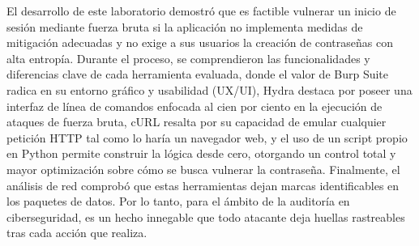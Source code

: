 \documentclass[letter,12pt]{article}
\begin{document}
El desarrollo de este laboratorio demostró que es factible vulnerar un inicio de sesión mediante fuerza bruta si la aplicación no implementa medidas de mitigación adecuadas y no exige a sus usuarios la creación de contraseñas con alta entropía. Durante el proceso, se comprendieron las funcionalidades y diferencias clave de cada herramienta evaluada, donde el valor de Burp Suite radica en su entorno gráfico y usabilidad (UX/UI), Hydra destaca por poseer una interfaz de línea de comandos enfocada al cien por ciento en la ejecución de ataques de fuerza bruta, cURL resalta por su capacidad de emular cualquier petición HTTP tal como lo haría un navegador web, y el uso de un script propio en Python permite construir la lógica desde cero, otorgando un control total y mayor optimización sobre cómo se busca vulnerar la contraseña. Finalmente, el análisis de red comprobó que estas herramientas dejan marcas identificables en los paquetes de datos. Por lo tanto, para el ámbito de la auditoría en ciberseguridad, es un hecho innegable que todo atacante deja huellas rastreables tras cada acción que realiza.
\end{document}
